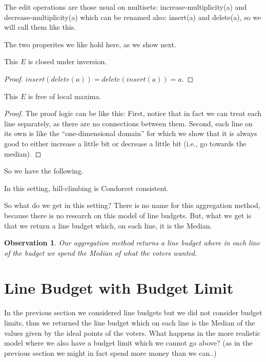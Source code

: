 \documentclass{llncs}
\newtheorem{observation}{Observation}
\begin{document}
The edit operations are those usual on multisets:  
  increase-multiplicity(a) and decrease-multiplicity(a) which can be renamed also: insert(a) and delete(a),
  so we will call them like this.

The two properites we like hold here, as we show next.

\begin{lemma}
  This $E$ is closed under inversion.
\end{lemma}

\begin{proof}
$insert(delete(a)) = delete(insert(a)) = a$.
\end{proof}

\begin{lemma}
  This $E$ is free of local maxima.
\end{lemma}

\begin{proof}
%
The proof logic can be like this:
  First, notice that in fact we can treat each line separately, as there are no connections between them.
  Second, each line on its own is like the ``one-dimensional domain'' for which we show that it is always good to either increase a little bit or decrease a little bit (i.e., go towards the median).
%
\end{proof}
  
So we have the following.

\begin{corollary}
  In this setting, hill-climbing is Condorcet consistent.
\end{corollary}

So what do we get in this setting?
There is no name for this aggregation method, because there is no research on this model of line budgets. But, what we get is that we return a line budget which, on each line, it is the Median.

\begin{observation}
Our aggregation method returns a line budget where in each line of the budget we spend the Median of what the voters wanted.
\end{observation}


\section{Line Budget with Budget Limit}

In the previous section we considered line budgets but we did not consider budget limits, thus we returned the line budget which on each line is the Median of the values given by the ideal points of the voters.
What happens in the more realistic model where we also have a budget limit which we cannot go above? (as in the previous section we might in fact spend more money than we can..)
\end{document}
